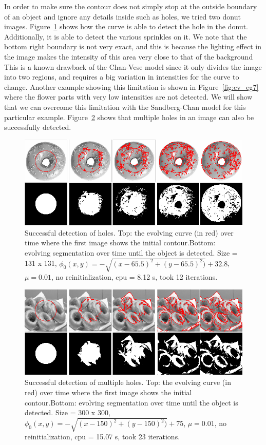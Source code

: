 \documentclass[10pt,journal,letterpaper,compsoc]{IEEEtran}
\begin{document}
In order to make sure the contour does not simply stop at the outside boundary of an object and ignore any details inside such as holes, we tried two donut
images. Figure~\ref{fig:cv_eg5} shows how the curve is able to detect the hole in the donut. Additionally, it is able to detect the various sprinkles on it.
We note that the bottom right boundary is not very exact, and this is because the lighting effect in the image makes the intensity of this area very close to
that of the background This is a known drawback of the Chan-Vese model since it only divides the image into two regions, and requires a big variation in
intensities for the curve to change. Another example showing this limitation is shown in Figure~\ref{fig:cv_eg7} where the flower parts with very low
intensities are not detected. We will show that we can overcome this limitation with the Sandberg-Chan model for this particular example.
Figure~\ref{fig:cv_eg6} shows that multiple holes in an image can also be successfully detected.

\begin{figure}[t]
\centering
\includegraphics[width=12cm]{cv_eg5.png}
\caption{Successful detection of holes.  Top: the evolving curve (in red) over time where the first image shows the initial
contour.Bottom: evolving segmentation over time until the object is detected. Size = 131 x 131, $\phi_{0}(x,y) = - \sqrt{(x - 65.5)^2 + (y - 65.5)^2)} + 32.8$,
$\mu =0.01$, no reinitialization, cpu = 8.12 s, took 12 iterations.}
\label{fig:cv_eg5}
\end{figure}

\begin{figure}[t]
\centering
\includegraphics[width=12cm]{cv_eg6.png}
\caption{Successful detection of multiple holes.  Top: the evolving curve (in red) over time where the first image shows the initial
contour.Bottom: evolving segmentation over time until the object is detected. Size = 300 x 300, $\phi_{0}(x,y) = - \sqrt{(x - 150)^2 + (y - 150)^2)} + 75$,
$\mu =0.01$, no reinitialization, cpu = 15.07 s, took 23 iterations.}
\label{fig:cv_eg6}
\end{figure}
\end{document}
